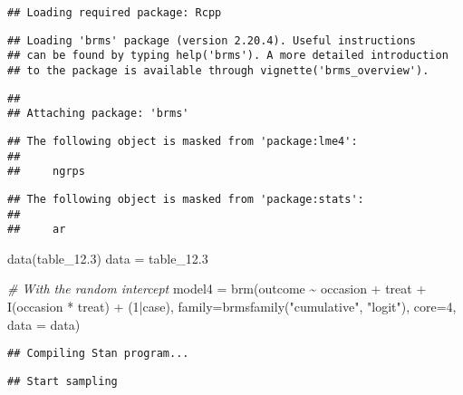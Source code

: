 \documentclass[
]{article}
\newenvironment{Shaded}{\begin{snugshade}}{\end{snugshade}}
\newcommand{\AttributeTok}[1]{\textcolor[rgb]{0.77,0.63,0.00}{#1}}
\newcommand{\CommentTok}[1]{\textcolor[rgb]{0.56,0.35,0.01}{\textit{#1}}}
\newcommand{\DecValTok}[1]{\textcolor[rgb]{0.00,0.00,0.81}{#1}}
\newcommand{\FloatTok}[1]{\textcolor[rgb]{0.00,0.00,0.81}{#1}}
\newcommand{\FunctionTok}[1]{\textcolor[rgb]{0.00,0.00,0.00}{#1}}
\newcommand{\NormalTok}[1]{#1}
\newcommand{\OtherTok}[1]{\textcolor[rgb]{0.56,0.35,0.01}{#1}}
\newcommand{\SpecialCharTok}[1]{\textcolor[rgb]{0.00,0.00,0.00}{#1}}
\newcommand{\StringTok}[1]{\textcolor[rgb]{0.31,0.60,0.02}{#1}}
\begin{document}
\begin{verbatim}
## Loading required package: Rcpp
\end{verbatim}

\begin{verbatim}
## Loading 'brms' package (version 2.20.4). Useful instructions
## can be found by typing help('brms'). A more detailed introduction
## to the package is available through vignette('brms_overview').
\end{verbatim}

\begin{verbatim}
## 
## Attaching package: 'brms'
\end{verbatim}

\begin{verbatim}
## The following object is masked from 'package:lme4':
## 
##     ngrps
\end{verbatim}

\begin{verbatim}
## The following object is masked from 'package:stats':
## 
##     ar
\end{verbatim}

\begin{Shaded}
\begin{Highlighting}[]
\FunctionTok{data}\NormalTok{(table\_12}\FloatTok{.3}\NormalTok{)}
\NormalTok{data }\OtherTok{=}\NormalTok{ table\_12}\FloatTok{.3}

\CommentTok{\# With the random intercept}
\NormalTok{model4 }\OtherTok{=} \FunctionTok{brm}\NormalTok{(outcome }\SpecialCharTok{\textasciitilde{}}\NormalTok{ occasion }\SpecialCharTok{+}\NormalTok{ treat }\SpecialCharTok{+} \FunctionTok{I}\NormalTok{(occasion }\SpecialCharTok{*}\NormalTok{ treat) }\SpecialCharTok{+}\NormalTok{ (}\DecValTok{1}\SpecialCharTok{|}\NormalTok{case), }\AttributeTok{family=}\FunctionTok{brmsfamily}\NormalTok{(}\StringTok{"cumulative"}\NormalTok{, }\StringTok{"logit"}\NormalTok{), }\AttributeTok{core=}\DecValTok{4}\NormalTok{, }\AttributeTok{data =}\NormalTok{ data)}
\end{Highlighting}
\end{Shaded}

\begin{verbatim}
## Compiling Stan program...
\end{verbatim}

\begin{verbatim}
## Start sampling
\end{verbatim}

\begin{Shaded}
\end{Shaded}
\end{document}
